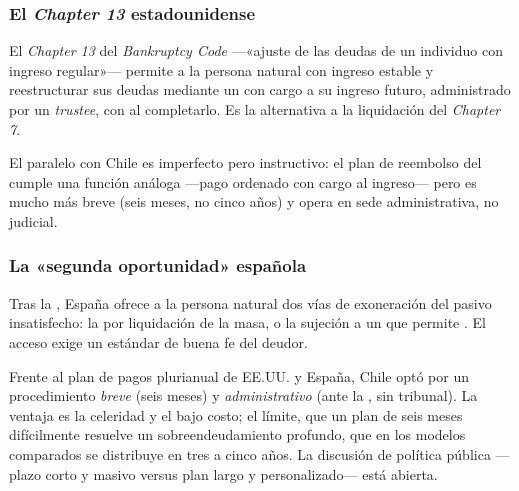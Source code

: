 \subsubsection{El \emph{Chapter 13} estadounidense}

El \emph{Chapter 13} del \emph{Bankruptcy Code} \parencite{us-bankruptcy-code} ---«ajuste de las
deudas de un individuo con ingreso regular»--- permite a la persona natural con ingreso estable
 y reestructurar sus deudas mediante un  con cargo a su ingreso futuro, administrado por un \emph{trustee}, con
\discharge{} al completarlo. Es la alternativa a la liquidación del \emph{Chapter 7}.

El paralelo con Chile es imperfecto pero instructivo: el plan de reembolso del  cumple
una función análoga ---pago ordenado con cargo al ingreso--- pero es mucho más breve (seis meses,
no cinco años) y opera en sede administrativa, no judicial.

\subsubsection{La «segunda oportunidad» española}

Tras la 
\parencite{esp-ley16-2022}, España ofrece a la persona natural dos vías de exoneración del pasivo
insatisfecho: la  por liquidación de la masa, o la sujeción a un
 que permite . El acceso exige un estándar de buena fe del deudor.

\begin{foco}
Frente al plan de pagos plurianual de EE.UU. y España, Chile optó por un procedimiento
\emph{breve} (seis meses) y \emph{administrativo} (ante la \superir{}, sin tribunal). La ventaja
es la celeridad y el bajo costo; el límite, que un plan de seis meses difícilmente resuelve un
sobreendeudamiento profundo, que en los modelos comparados se distribuye en tres a cinco años.
La discusión de política pública ---plazo corto y masivo versus plan largo y personalizado---
está abierta.
\end{foco}

\bloquePractico

